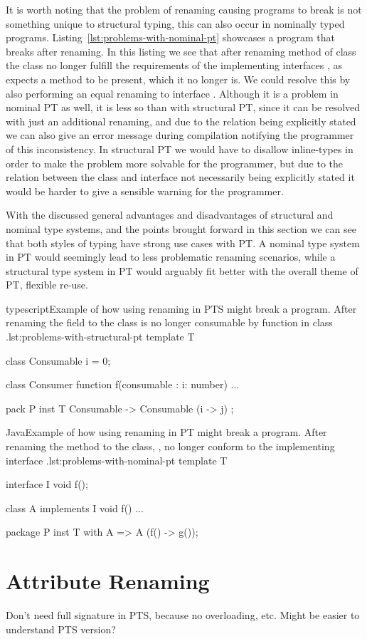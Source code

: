 It is worth noting that the problem of renaming causing programs to break is not something unique to structural typing, this can also occur in nominally typed programs.
Listing~\vref{lst:problems-with-nominal-pt} showcases a program that breaks after renaming.
In this listing we see that after renaming method  of class  the class no longer fulfill the requirements of the implementing interfaces , as  expects a method  to be present, which it no longer is.
We could resolve this by also performing an equal renaming to interface .
Although it is a problem in nominal PT as well, it is less so than with structural PT, since it can be resolved with just an additional renaming, and due to the relation being explicitly stated we can also give an error message during compilation notifying the programmer of this inconsistency.
In structural PT we would have to disallow inline-types in order to make the problem more solvable for the programmer, but due to the relation between the class and interface not necessarily being explicitly stated it would be harder to give a sensible warning for the programmer.

With the discussed general advantages and disadvantages of structural and nominal type systems, and the points brought forward in this section we can see that both styles of typing have strong use cases with PT\@.
A nominal type system in PT would seemingly lead to less problematic renaming scenarios, while a structural type system in PT would arguably fit better with the overall theme of PT, flexible re-use.


\begin{code}{typescript}{Example of how using renaming in PTS might break a program. After renaming the field  to  the class  is no longer consumable by function  in class .}{lst:problems-with-structural-pt}
    template T {
        class Consumable {
            i = 0;
        }

        class Consumer {
            function f(consumable : {i: number}) {
                ...
            }
        }
    }

    pack P {
        inst T { Consumable -> Consumable (i -> j) };
    }
\end{code}

\begin{code}{Java}{Example of how using renaming in PT might break a program. After renaming the method  to  the class, , no longer conform to the implementing interface .}{lst:problems-with-nominal-pt}
    template T {
        interface I {
            void f();
        }

        class A implements I {
            void f() { ... }
        }
    }

    package P {
        inst T with A => A (f() -> g());
    }
\end{code}

\section{Attribute Renaming}\label{sec:attribute-renaming}

Don't need full signature in PTS, because no overloading, etc.
Might be easier to understand PTS version?